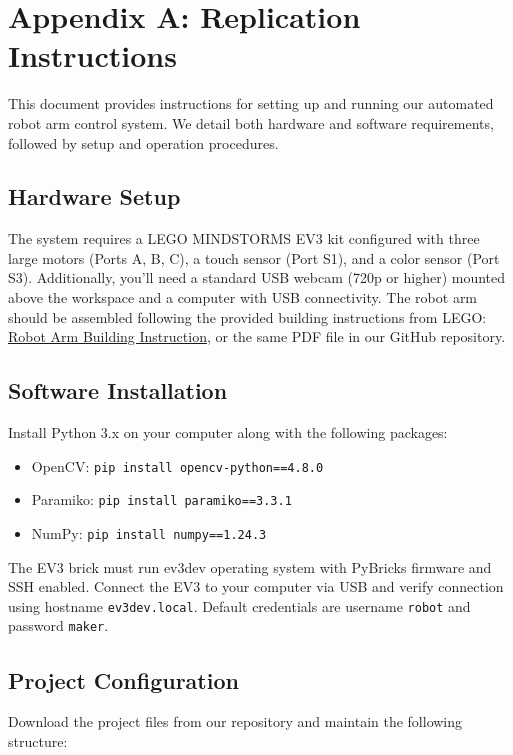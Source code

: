 \documentclass[10pt,twocolumn]{article}
\begin{document}
\section*{Appendix A: Replication Instructions}

This document provides instructions for setting up and running our automated robot arm control system. We detail both hardware and software requirements, followed by setup and operation procedures.

\subsection*{Hardware Setup}
The system requires a LEGO MINDSTORMS EV3 kit configured with three large motors (Ports A, B, C), a touch sensor (Port S1), and a color sensor (Port S3). Additionally, you'll need a standard USB webcam (720p or higher) mounted above the workspace and a computer with USB connectivity. The robot arm should be assembled following the provided building instructions from LEGO: \href{https://le-www-live-s.legocdn.com/sc/media/lessons/mindstorms-ev3/building-instructions/ev3-model-core-set-robot-arm-h25-56cdb22c1e3a02f1770bda72862ce2bd.pdf}{Robot Arm Building Instruction}, or the same PDF file in our GitHub repository.

\subsection*{Software Installation}
Install Python 3.x on your computer along with the following packages:
\begin{itemize}
    \item OpenCV: \texttt{pip install opencv-python==4.8.0}
    \item Paramiko: \texttt{pip install paramiko==3.3.1}
    \item NumPy: \texttt{pip install numpy==1.24.3}
\end{itemize}

The EV3 brick must run ev3dev operating system with PyBricks firmware and SSH enabled. Connect the EV3 to your computer via USB and verify connection using hostname \texttt{ev3dev.local}. Default credentials are username \texttt{robot} and password \texttt{maker}.

\subsection*{Project Configuration}
Download the project files from our repository and maintain the following structure:
\end{document}
